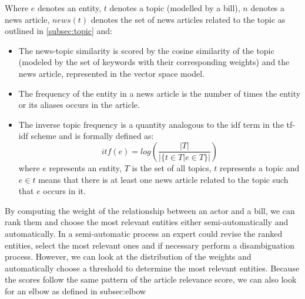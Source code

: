 Where $e$ denotes an entity, $t$ denotes a topic (modelled by a bill), $n$ denotes a news article, $news(t)$ denotes the set of news articles related to the topic as outlined in \ref{subsec:topic} and:

\begin{itemize}
\item The news-topic similarity is scored by the cosine similarity of the topic (modeled by the set of keywords with their corresponding weights) and the news article, represented in the vector space model.
\item The frequency of the entity in a news article is the number of times the entity or its aliases occurs in the article.
\item The inverse topic frequency is a quantity analogous to the idf term in the tf-idf scheme and is formally defined as: $$itf(e) = log(\frac{\left\vert{T}\right\vert}{\vert \{t \in T \vert e  \in T\} \vert })$$ where $e$ represents an entity, $T$ is the set of all topics, $t$ represents a topic and $e \in t$ means that there is at least one news article related to the topic such that $e$ occurs in it.
\end{itemize}

By computing the weight of the relationship between an actor and a bill, we can rank them and choose the most relevant entities either semi-automatically and automatically. In a semi-automatic process an expert could revise the ranked entities, select the most relevant ones and if necessary perform a disambiguation process. However, we can look at the distribution of the weights and automatically choose a threshold to determine the most relevant entities. Because the scores follow the same pattern of the article relevance score, we can also look for an elbow as defined in {subsec:elbow}

\fi

